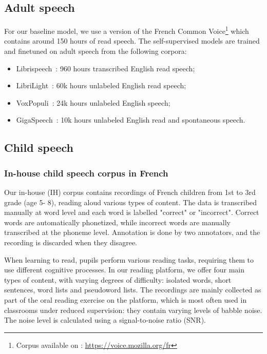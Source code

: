 \documentclass{Interspeech2024}
\begin{document}
\subsection{Adult speech}

For our baseline model, we use a version of the French Common Voice\footnote{\scriptsize Corpus available on : \url{https://voice.mozilla.org/fr}} which contains around 150 hours of read speech. The self-supervised models are trained and finetuned on adult speech from the following corpora:
\begin{itemize}
    \item Librispeech~\cite{Panayotov2015-LiSp}: 960 hours transcribed English read speech;
    \item LibriLight~\cite{Kahn_2020}: 60k hours unlabeled English read speech;
    \item VoxPopuli~\cite{wang2021voxpopuli}: 24k hours unlabeled English speech;
    \item GigaSpeech~\cite{chen2021gigaspeech}: 10k hours unlabeled English read and spontaneous speech.
\end{itemize}

\subsection{Child speech}
\subsubsection{In-house child speech corpus in French} %
\label{sec:lalilo-data}
Our in-house (IH) corpus contains recordings of French children from 1st to 3rd grade (age 5- 8), reading aloud various types of content. The data is transcribed manually at word level and each word is labelled  "correct" or "incorrect". Correct words are automatically phonetized, while incorrect words are manually transcribed at the phoneme level. Annotation is done by two annotators, and the recording is discarded when they disagree.

When learning to read, pupils perform various reading tasks, requiring them to use different cognitive processes. 
In our reading platform, we offer four main types of content, with varying degrees of difficulty: isolated words, short sentences, word lists and pseudoword lists.
The recordings are mainly collected as part of the oral reading exercise on the platform, which is most often used in classrooms under reduced supervision: they contain varying levels of babble noise. The noise level is calculated using a signal-to-noise ratio (SNR).
\end{document}
